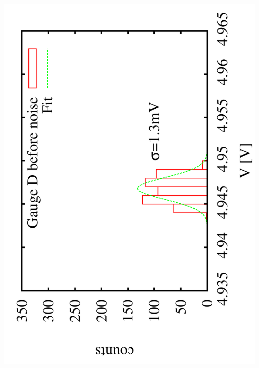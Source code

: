 \documentclass[a4paper,11pt]{book}
\begin{document}
\includegraphics[scale=0.15,angle=-90]{image_ai_21e3.pdf}
\end{document}
